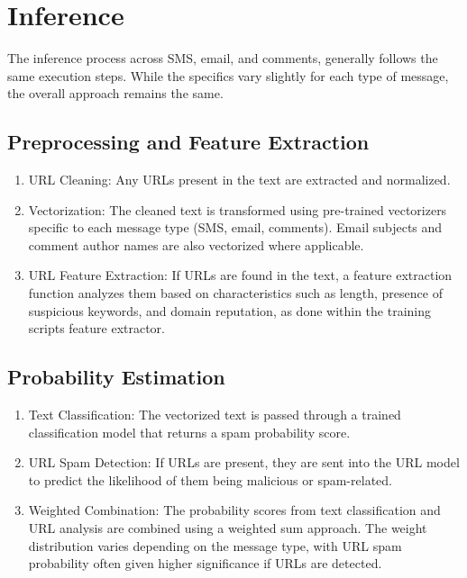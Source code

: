 \documentclass{article}
\begin{document}
\newpage

\section{Inference}

The inference process across SMS, email, and comments, generally follows the same execution steps. While the specifics vary slightly for each type of message, the overall approach remains the same.


\subsection{Preprocessing and Feature Extraction}

\begin{enumerate}
    \item URL Cleaning: Any URLs present in the text are extracted and normalized.
    \item Vectorization: The cleaned text is transformed using pre-trained vectorizers specific to each message type (SMS, email, comments). Email subjects and comment author names are also vectorized where applicable.
    \item URL Feature Extraction: If URLs are found in the text, a feature extraction function analyzes them based on characteristics such as length, presence of suspicious keywords, and domain reputation, as done within the training scripts feature extractor.
\end{enumerate}

\subsection{Probability Estimation}

\begin{enumerate}
    \item Text Classification: The vectorized text is passed through a trained classification model that returns a spam probability score.
    \item URL Spam Detection: If URLs are present, they are sent into the URL model to predict the likelihood of them being malicious or spam-related.
    \item Weighted Combination: The probability scores from text classification and URL analysis are combined using a weighted sum approach. The weight distribution varies depending on the message type, with URL spam probability often given higher significance if URLs are detected.
\end{enumerate}
\end{document}
